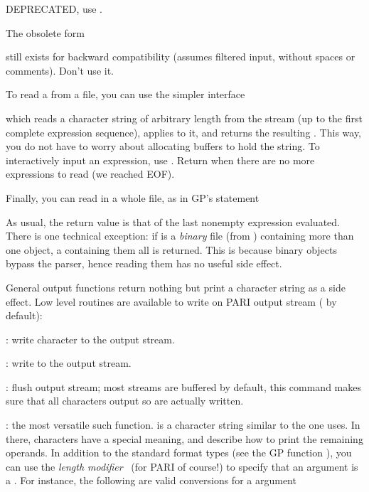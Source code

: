  DEPRECATED, use
.

 The obsolete form


still exists for backward compatibility (assumes filtered input, without
spaces or comments). Don't use it.

To read a  from a file, you can use the simpler interface


\noindent which reads a character string of arbitrary length from the stream
 (up to the first complete expression sequence), applies
 to it, and returns the resulting . This way, you
do not have to worry about allocating buffers to hold the string. To
interactively input an expression, use .
Return  when there are no more expressions to read (we reached
EOF).

Finally, you can read in a whole file, as in GP's  statement


\noindent As usual, the return value is that of the last nonempty expression
evaluated. There is one technical exception: if  is a \emph{binary}
file (from ) containing more than one object, a 
containing them all is returned. This is because binary objects bypass the
parser, hence reading them has no useful side effect.


General output functions return nothing but print a character string as a
side effect. Low level routines are available to write on PARI output stream
 ( by default):

: write character  to the output stream.

: write  to the output stream.

: flush output stream; most streams are buffered by
default, this command makes sure that all characters output so are actually
written.

: the most versatile such
function.  is a character string similar to the one
 uses. In there, \kbd{\%} characters have a special meaning, and
describe how to print the remaining operands. In addition to the standard
format types (see the GP function ), you can use the \emph{length
modifier}~ (for PARI of course!) to specify that an argument is a
. For instance, the following are valid conversions for a 
argument
\bprog

